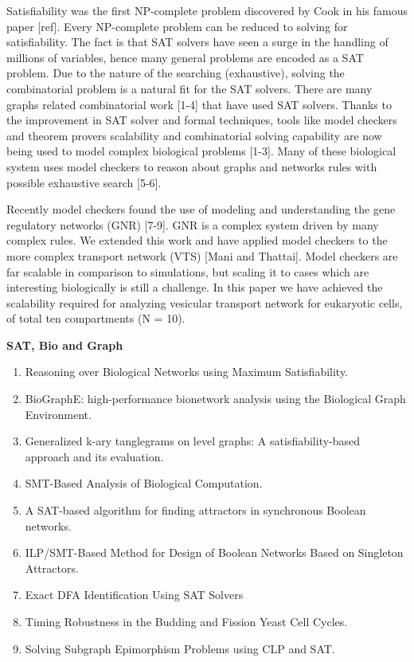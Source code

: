 
Satisfiability was the first NP-complete problem discovered by Cook in his famous paper [ref]. Every NP-complete problem can be reduced to solving for satisfiability. The fact is that SAT solvers have seen a surge in the handling of millions of variables, hence many general problems are encoded as a SAT problem. Due to the nature of the searching (exhaustive), solving the combinatorial problem is a natural fit for the SAT solvers. There are many graphs related combinatorial work [1-4] that have used SAT solvers. Thanks to the improvement in SAT solver and formal techniques, tools like model checkers and theorem provers scalability and combinatorial solving capability are now being used to model complex biological problems [1-3].
Many of these biological system uses model checkers to reason about graphs and networks rules with possible exhaustive search [5-6].  

Recently model checkers found the use of modeling and understanding the gene regulatory networks (GNR) [7-9]. GNR is a complex system driven by many complex rules. We extended this work and have applied model checkers to the more complex transport network (VTS) [Mani and Thattai]. Model checkers are far scalable in comparison to simulations, but scaling it to cases which are interesting biologically is still a challenge. In this paper we have achieved the scalability required for analyzing vesicular transport network for eukaryotic cells, of total ten compartments (N = 10).


\textbf{SAT, Bio and Graph}
\begin{enumerate}
\item Reasoning over Biological Networks using Maximum Satisfiability.
\item BioGraphE: high-performance bionetwork analysis using the Biological Graph Environment.
\item Generalized k-ary tanglegrams on level graphs: A satisfiability-based approach and its evaluation.
\item SMT-Based Analysis of Biological Computation.
\item A SAT-based algorithm for finding attractors in synchronous Boolean networks.
\item ILP/SMT-Based Method for Design of Boolean Networks Based on Singleton Attractors.
\item Exact DFA Identification Using SAT Solvers
\item Timing Robustness in the Budding and Fission Yeast Cell Cycles.
\item Solving Subgraph Epimorphism Problems using CLP
and SAT.
\end{enumerate}

